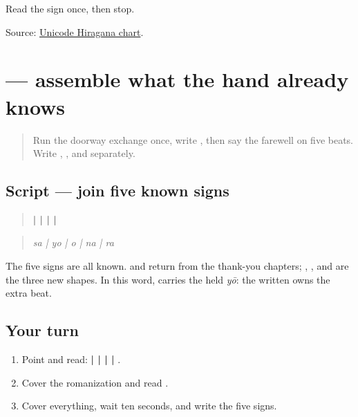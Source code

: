 \begin{tcolorbox}[breakable,colback=teal!4,colframe=teal!35!black,title={Before you move on}]
Read the sign once, then stop.

Source: \href{https://www.unicode.org/charts/PDF/U3040.pdf}{Unicode Hiragana chart}.
\end{tcolorbox}
\section[\texorpdfstring{\ja{さようなら} (sayōnara)}{さようなら (sayōnara)}]{ — assemble what the hand already knows}

\label{lesson:JA-W08-sayounara-read}



\begin{quote}
Run the doorway exchange once, write \textbf{}, then say the farewell on five beats. Write \textbf{}, \textbf{}, and \textbf{} separately.
\end{quote}

\subsection*{Script — join five known signs}

\begin{quote}
\textbf{ |  |  |  | }
\end{quote}

\begin{quote}
\emph{sa | yo | o | na | ra}
\end{quote}

The five signs are all known. \textbf{} and \textbf{} return from the thank-you chapters; \textbf{}, \textbf{}, and \textbf{} are the three new shapes. In this word, \textbf{} carries the held \emph{yō}: the written \textbf{} owns the extra beat.

\subsection*{Your turn}
\begin{enumerate}
\raggedright
  \item Point and read: \textbf{ |  |  |  | }.
  \item Cover the romanization and read \textbf{}.
  \item Cover everything, wait ten seconds, and write the five signs.
\end{enumerate}

